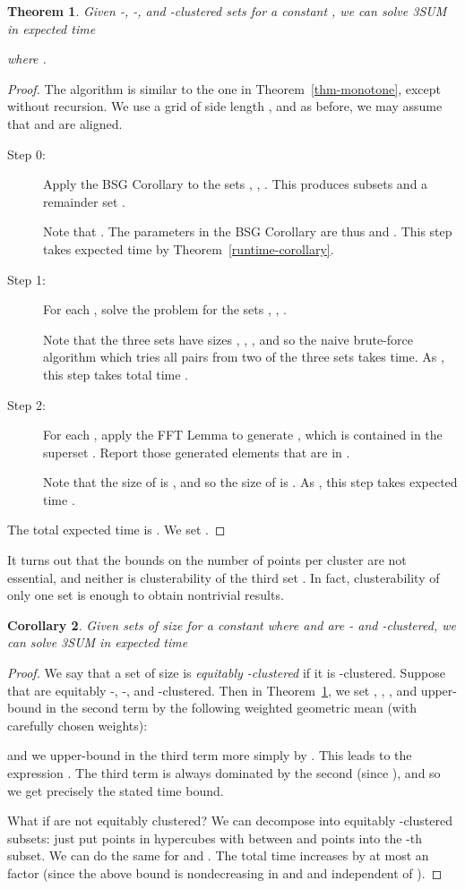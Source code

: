 \documentclass[11pt]{article}
\newtheorem{theorem}{Theorem}[section]
\newtheorem{corollary}[theorem]{Corollary}
\begin{document}
\begin{theorem}\label{thm-cluster}
Given -, -, and -clustered
sets  for a constant ,
we can solve 3SUM in expected time

where .
\end{theorem}
\begin{proof}
The algorithm is similar to the one in Theorem~\ref{thm-monotone},
except without recursion.
We use a grid of side length , and
as before,
we may assume that  and  are aligned.
\begin{description}
\item[Step 0:]
Apply the BSG Corollary to the sets ,
, .
This produces subsets  and a remainder set .

Note that .
The parameters in the BSG Corollary
are thus  and .
This step takes  expected time
by Theorem~\ref{runtime-corollary}.
\item[Step 1:]
For each ,
solve the problem for the sets
, ,
.

Note that the three sets have sizes , ,
, and so the naive brute-force algorithm which
tries all pairs from two of the three sets takes  time.
As , this step takes total
time .

\item[Step 2:]
For each ,
apply the FFT Lemma to generate
,
which is contained in the
superset .
Report those generated elements that are in .

Note that the size of  is ,
and so the size of  is .
As , this step takes expected time
.
\end{description}

The total expected time is
.
We set .
\end{proof}

It turns out that the  bounds on the number of points
per cluster are not essential, and neither is clusterability
of the third set .  In fact, clusterability of only one
set  is enough to obtain nontrivial results.

\begin{corollary}\label{cor-cluster}
Given sets  of size  for a constant  where
 and  are - and -clustered,
we can solve 3SUM in expected time


\end{corollary}
\begin{proof}
We say that a set of size  is \emph{equitably -clustered} if
it is -clustered.  Suppose that 
are equitably  -, -, and -clustered.
Then in Theorem~\ref{thm-cluster}, we set ,
, , and
upper-bound  in the second term by the following
weighted geometric mean
(with carefully chosen weights):

and we upper-bound  in the third term more simply by .
This leads to the expression
.
The third term is always dominated by the second (since ),
and so we get precisely the stated time bound.

What if  are not equitably clustered?
We can decompose  into 
equitably -clustered subsets: just put points in
hypercubes with between  and  points into the -th
subset.  We can do the same for  and .
The total time increases by at most an  factor
(since the above bound is nondecreasing in  and 
and independent of ).
\end{proof}
\end{document}
